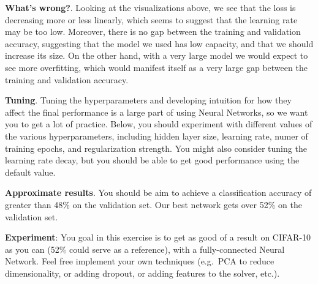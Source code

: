 \documentclass[11pt]{article}
\begin{document}
\textbf{What's wrong?}. Looking at the visualizations above, we see that
the loss is decreasing more or less linearly, which seems to suggest
that the learning rate may be too low. Moreover, there is no gap between
the training and validation accuracy, suggesting that the model we used
has low capacity, and that we should increase its size. On the other
hand, with a very large model we would expect to see more overfitting,
which would manifest itself as a very large gap between the training and
validation accuracy.

\textbf{Tuning}. Tuning the hyperparameters and developing intuition for
how they affect the final performance is a large part of using Neural
Networks, so we want you to get a lot of practice. Below, you should
experiment with different values of the various hyperparameters,
including hidden layer size, learning rate, numer of training epochs,
and regularization strength. You might also consider tuning the learning
rate decay, but you should be able to get good performance using the
default value.

\textbf{Approximate results}. You should be aim to achieve a
classification accuracy of greater than 48\% on the validation set. Our
best network gets over 52\% on the validation set.

\textbf{Experiment}: You goal in this exercise is to get as good of a
result on CIFAR-10 as you can (52\% could serve as a reference), with a
fully-connected Neural Network. Feel free implement your own techniques
(e.g.~PCA to reduce dimensionality, or adding dropout, or adding
features to the solver, etc.).
\end{document}
